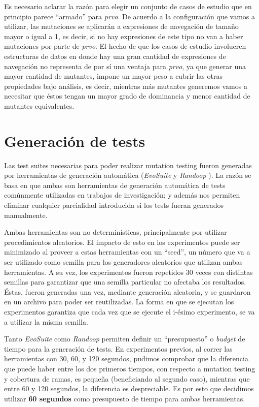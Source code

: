 Es necesario aclarar la raz\'on para elegir un conjunto de casos de estudio que en principio parece ``armado'' para \emph{prvo}. De acuerdo a la configuraci\'on que vamos a utilizar, las mutaciones se aplicar\'an a expresiones de navegaci\'on de tama\~no mayor o igual a 1, es decir, si no hay expresiones de este tipo no van a haber mutaciones por parte de \emph{prvo}. El hecho de que los casos de estudio involucren estructuras de datos en donde hay una gran cantidad de expresiones de navegaci\'on no representa de por s\'i una ventaja para \emph{prvo}, ya que generar una mayor cantidad de mutantes, impone un mayor peso a cubrir las otras propiedades bajo an\'alisis, es decir, mientras m\'as mutantes generemos vamos a necesitar que \'estos tengan un mayor grado de dominancia y menor cantidad de mutantes equivalentes.

\section{Generaci\'on de tests}
\label{sec:evaluation.tests}

Las test suites necesarias para poder realizar mutation testing fueron generadas por herramientas de generaci\'on autom\'atica (\emph{EvoSuite} \cite{bibliography.testing.generation.EvoSuiteFraserA11} y \emph{Randoop} \cite{bibliography.testing.generation.RandoopPachecoE07}). La raz\'on se basa en que ambas son herramientas de generaci\'on autom\'atica de tests com\'unmente utilizadas en trabajos de investigaci\'on; y adem\'as nos permiten eliminar cualquier parcialidad introducida si los tests fueran generados manualmente.

Ambas herramientas son no determin\'isticas, principalmente por utilizar procedimientos aleatorios. El impacto de esto en los experimentos puede ser minimizado al proveer a estas herramientas con un ``seed'', un n\'umero que va a ser utilizado como semilla para los generadores aleatorios que utilizan ambas herramientas. A su vez, los experimentos fueron repetidos 30 veces con distintas semillas para garantizar que una semilla particular no afectaba los resultados. \'Estas, fueron generadas una vez, mediante generaci\'on aleatoria, y se guardaron en un archivo para poder ser reutilizadas. La forma en que se ejecutan los experimentos garantiza que cada vez que se ejecute el i-\'esimo experimento, se va a utilizar la misma semilla.

Tanto \emph{EvoSuite} como \emph{Randoop} permiten definir un ``presupuesto'' o \emph{budget} de tiempo para la generaci\'on de tests. En experimentos previos, al correr las herramientas con 30, 60, y 120 segundos, pudimos comprobar que la diferencia que puede haber entre los dos primeros tiempos, con respecto a mutation testing y cobertura de ramas, es peque\~na (beneficiando al segundo caso), mientras que entre 60 y 120 segundos, la diferencia es despreciable. Es por esto que decidimos utilizar \textbf{60 segundos} como presupuesto de tiempo para ambas herramientas.

